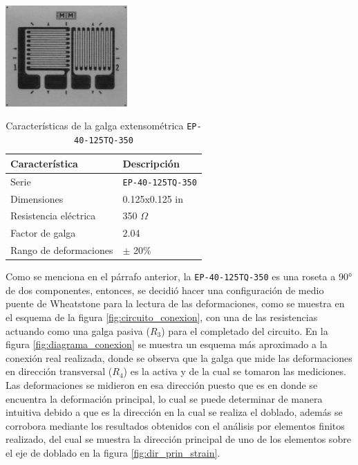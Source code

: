 \begin{center}
\includegraphics[width=0.35\textwidth]{src/ch3/strain_gage.png}
\label{fig:strain_gage}
\end{center}

\begin{table}[h]
\centering
\caption{Características de la galga extensométrica \texttt{EP-40-125TQ-350}}
\label{tab:strain_gage_props}
\begin{tabular}{p{6cm} p{4cm}} \hline
Característica & Descripción \\
\hline
Serie & \texttt{EP-40-125TQ-350} \\
Dimensiones & 0.125x0.125 in \\
Resistencia eléctrica &  350 $\Omega$  \\
Factor de galga & 2.04 \\
Rango de deformaciones & $\pm$ 20\% \\
\hline
\end{tabular}
\end{table}

Como se menciona en el párrafo anterior, la \texttt{EP-40-125TQ-350} es una roseta 
a 90° de dos componentes, entonces, se decidió hacer una configuración de 
medio puente de Wheatstone para la lectura de las deformaciones, como se muestra 
en el esquema de la figura \ref{fig:circuito_conexion}, con una de las resistencias 
actuando como una galga pasiva ($R_3$) para el completado del circuito. En la figura 
\ref{fig:diagrama_conexion} se muestra un esquema más aproximado a la conexión real 
realizada, donde se observa que la galga que mide las deformaciones en dirección 
transversal ($R_4$) es la activa y de la cual se tomaron las mediciones. Las deformaciones  
se midieron en esa dirección puesto que es en donde se encuentra la deformación 
principal, lo cual se puede determinar de manera intuitiva debido a que es la dirección 
en la cual se realiza el doblado, además se corrobora mediante los resultados obtenidos 
con el análisis por elementos finitos realizado, del cual se muestra la dirección 
principal de uno de los elementos sobre el eje de doblado en la figura \ref{fig:dir_prin_strain}.


